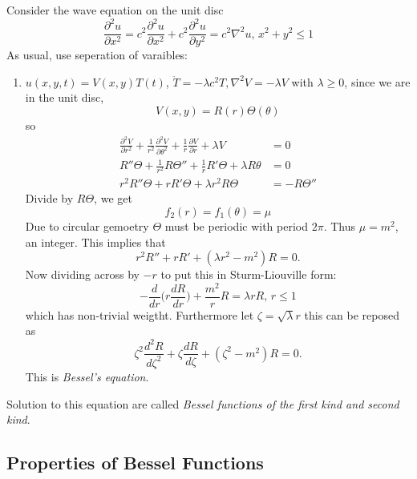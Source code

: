 \documentclass[a4paper]{article}
\begin{document}
Consider the wave equation on the unit disc
\[
  \frac{\partial^2 u}{\partial x^2} = c^2 \frac{\partial^2 u}{\partial x^2} + c^2 \frac{\partial^2 u}{\partial y^2} = c^2\nabla^2u, \, x^2+y^2\leq 1
\]
As usual, use seperation of varaibles:
\begin{enumerate}%
\item \(u(x,y,t) = V(x,y)T(t)\), \(\ddot T = -\lambda c^2T, \nabla^2V = -\lambda V\) with \(\lambda \geq 0\), since we are in the unit disc,
  \[
    V(x,y) = R(r) \Theta(\theta)
  \]
  so
  \begin{align*}
    \frac{\partial^2 V}{\partial r^2} + \frac{1}{r^2} \frac{\partial^2 V}{\partial \theta^2} + \frac{1}{r}\frac{\partial V}{\partial r} + \lambda V &= 0 \\
    R''\Theta + \frac{1}{r^2} R\Theta'' + \frac{1}{r}R'\Theta+\lambda R\theta &= 0 \\
    r^2R''\Theta+rR'\Theta+\lambda r^2R\Theta &= -R\Theta''
  \end{align*}
  Divide by \(R\Theta\), we get
  \[
    f_2(r) = f_1(\theta) = \mu
  \]
  Due to circular gemoetry \(\Theta\) must be periodic with period \(2\pi\). Thus \(\mu = m^2\), an integer. This implies that
  \[
    r^2R'' + rR' + (\lambda r^2-m^2)R = 0.
  \]
  Now dividing across by \(-r\) to put this in Sturm-Liouville form:
  \[
    -\frac{d}{dr}\big( r \frac{d R}{d r} \big) + \frac{m^2}{r}R = \lambda r R, \, r\leq 1
  \]
  which has non-trivial weigtht. Furthermore let \(\zeta = \sqrt\lambda r\) this can be reposed as
  \[
    \zeta^2 \frac{d^2 R}{d\zeta^2} + \zeta \frac{d R}{d \zeta} + (\zeta^2-m^2)R = 0.
  \]
  This is \emph{Bessel's equation}.
\end{enumerate}

Solution to this equation are called \emph{Bessel functions of the first kind and second kind}.

\subsection{Properties of Bessel Functions}
\end{document}
